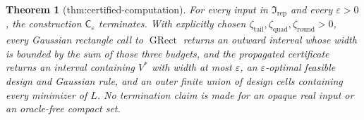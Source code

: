 \documentclass{article}
\newtheorem{theorem}{Theorem}
\begin{document}
\begin{theorem}[thm:certified-computation]\label{thm:certified-computation}
For every input in \(\mathfrak I_{\mathrm{rep}}\) and every \(\varepsilon>0\), the construction \(\mathsf C_\varepsilon\) terminates. With explicitly chosen \(\zeta_{\mathrm{tail}},\zeta_{\mathrm{quad}},\zeta_{\mathrm{round}}>0\), every Gaussian rectangle call to \(\operatorname{GRect}\) returns an outward interval whose width is bounded by the sum of those three budgets, and the propagated certificate returns an interval containing \(V^*\) with width at most \(\varepsilon\), an \(\varepsilon\)-optimal feasible design and Gaussian rule, and an outer finite union of design cells containing every minimizer of \(L\). No termination claim is made for an opaque real input or an oracle-free compact set.
\end{theorem}
\end{document}
